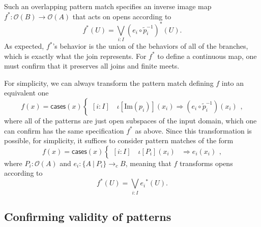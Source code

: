 \documentclass[conference]{IEEEtran}
\newcommand{\cto}{\to_c}
\newcommand{\suchthat}{\ |\ }
\newcommand{\Open}[1]{\mathcal{O}({#1})}
\newcommand{\Img}[1]{\text{Im}\left({#1}\right)}
\newcommand{\oinclf}[1]{\iota[{#1}]}
\newcommand{\oincl}[2]{\oinclf{#1} \left({#2}\right)}
\newcommand{\Branch}{\Rightarrow}
\newcommand{\iimg}[1]{{#1}^*}
\begin{document}
Such an overlapping pattern match specifies an inverse image map $\iimg{f} : \Open{B} \to \Open{A}$ that acts on opens according to
\[
\iimg{f}(U) = \bigvee_{i : I} \iimg{(e_i \circ \tilde{p}_i^{-1})}(U).
\]
As expected, $\iimg{f}$'s behavior is the union of the behaviors of all of the branches, which is exactly what the join represents. For $\iimg{f}$ to define a continuous map, one must confirm that it preserves all joins and finite meets.

For simplicity, we can always transform the pattern match defining $f$ into an equivalent one
\[
f(x) = \mathsf{cases}(x)
\begin{cases}
[i : I] \quad \oincl{\Img{p_i}}{x_i} \Branch (e_i \circ \tilde{p}_i^{-1})(x_i)
\end{cases},
\]
where all of the patterns are just open subspaces of the input domain, which one can confirm has the same specification $\iimg{f}$ as above. Since this transformation is possible, for simplicity, it suffices to consider pattern matches of the form
\[
f(x) = \mathsf{cases}(x)
\begin{cases}
[i : I] \quad \oincl{P_i}{x_i} &\Branch e_i(x_i)
\end{cases},
\]
where $P_i : \Open{A}$ and $e_i : \{ A \suchthat P_i \} \cto B$, meaning that $f$ transforms opens according to
\[
\iimg{f}(U) = \bigvee_{i : I} \iimg{e_i}(U).
\]

\subsection{Confirming validity of patterns}
\end{document}
